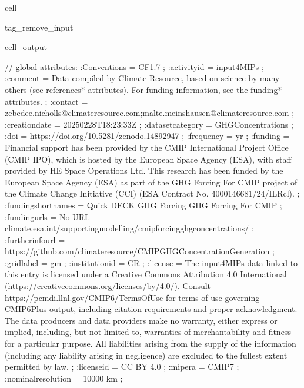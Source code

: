 \documentclass[letterpaper,10pt,english]{jupyterBook}
\begin{document}
\begin{sphinxuseclass}{cell}
\begin{sphinxuseclass}{tag_remove_input}
\begin{sphinxVerbatimOutput}
\begin{sphinxuseclass}{cell_output}
\begin{sphinxVerbatim}[commandchars=\\\{\}]
// global attributes:
		:Conventions = \PYGZdq{}CF\PYGZhy{}1.7\PYGZdq{} ;
		:activity\PYGZus{}id = \PYGZdq{}input4MIPs\PYGZdq{} ;
		:comment = \PYGZdq{}Data compiled by Climate Resource, based on science
by many others (see \PYGZbs{}\PYGZsq{}references*\PYGZbs{}\PYGZsq{} attributes). For funding information, see
the \PYGZbs{}\PYGZsq{}funding*\PYGZbs{}\PYGZsq{} attributes.\PYGZdq{} ;
		:contact =
\PYGZdq{}zebedee.nicholls@climate\PYGZhy{}resource.com;malte.meinshausen@climate\PYGZhy{}resource.com\PYGZdq{} ;
		:creation\PYGZus{}date = \PYGZdq{}2025\PYGZhy{}02\PYGZhy{}28T18:23:33Z\PYGZdq{} ;
		:dataset\PYGZus{}category = \PYGZdq{}GHGConcentrations\PYGZdq{} ;
		:doi = \PYGZdq{}https://doi.org/10.5281/zenodo.14892947\PYGZdq{} ;
		:frequency = \PYGZdq{}yr\PYGZdq{} ;
		:funding = \PYGZdq{}Financial support has been provided by the CMIP
International Project Office (CMIP IPO), which is hosted by the European Space
Agency (ESA), with staff provided by HE Space Operations Ltd. This research has
been funded by the European Space Agency (ESA) as part of the GHG Forcing For
CMIP project of the Climate Change Initiative (CCI) (ESA Contract No.
4000146681/24/I\PYGZhy{}LR\PYGZhy{}cl).\PYGZdq{} ;
		:funding\PYGZus{}short\PYGZus{}names = \PYGZdq{}Quick DECK GHG Forcing \PYGZhy{}\PYGZhy{}\PYGZhy{} GHG Forcing
For CMIP\PYGZdq{} ;
		:funding\PYGZus{}urls = \PYGZdq{}No URL \PYGZhy{}\PYGZhy{}\PYGZhy{}
climate.esa.int/supporting\PYGZhy{}modelling/cmip\PYGZhy{}forcing\PYGZhy{}ghg\PYGZhy{}concentrations/\PYGZdq{} ;
		:further\PYGZus{}info\PYGZus{}url =
\PYGZdq{}https://github.com/climate\PYGZhy{}resource/CMIP\PYGZhy{}GHG\PYGZhy{}Concentration\PYGZhy{}Generation\PYGZdq{} ;
		:grid\PYGZus{}label = \PYGZdq{}gm\PYGZdq{} ;
		:institution\PYGZus{}id = \PYGZdq{}CR\PYGZdq{} ;
		:license = \PYGZdq{}The input4MIPs data linked to this entry is
licensed under a Creative Commons Attribution 4.0 International
(https://creativecommons.org/licenses/by/4.0/). Consult
https://pcmdi.llnl.gov/CMIP6/TermsOfUse for terms of use governing CMIP6Plus
output, including citation requirements and proper acknowledgment. The data
producers and data providers make no warranty, either express or implied,
including, but not limited to, warranties of merchantability and fitness for a
particular purpose. All liabilities arising from the supply of the information
(including any liability arising in negligence) are excluded to the fullest
extent permitted by law.\PYGZdq{} ;
		:license\PYGZus{}id = \PYGZdq{}CC BY 4.0\PYGZdq{} ;
		:mip\PYGZus{}era = \PYGZdq{}CMIP7\PYGZdq{} ;
		:nominal\PYGZus{}resolution = \PYGZdq{}10000 km\PYGZdq{} ;

\end{sphinxVerbatim}
\end{sphinxuseclass}
\end{sphinxVerbatimOutput}
\end{sphinxuseclass}
\end{sphinxuseclass}
\end{document}

